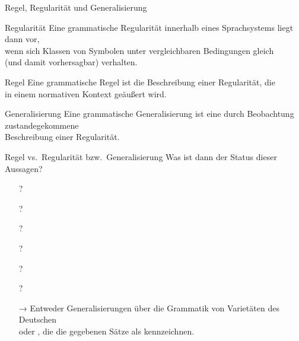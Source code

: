 \begin{frame}
  {Regel, Regularität und Generalisierung}
  \onslide<+->
  \onslide<+->
  \begin{block}{Regularität}
    Eine grammatische Regularität innerhalb eines Sprachsystems liegt dann vor,\\
    wenn sich Klassen von Symbolen unter vergleichbaren Bedingungen gleich\\
    (und damit vorhersagbar) verhalten.
  \end{block}

  \onslide<+->
  \Halbzeile

  \begin{block}{Regel}
    Eine grammatische Regel ist die Beschreibung einer Regularität, die\\
    in einem normativen Kontext geäußert wird.
  \end{block}

  \onslide<+->
  \Halbzeile
  
  \begin{block}{Generalisierung}
    Eine grammatische Generalisierung ist eine durch Beobachtung zustandegekommene\\
    Beschreibung einer Regularität.
  \end{block}
\end{frame}

\begin{frame}
  {Regel vs.\ Regularität bzw.\ Generalisierung}
  \onslide<+->
  \onslide<+->
  Was ist dann der Status dieser Aussagen?\\
  \Zeile 
  \onslide<+->
  \begin{itemize}
    \item[?] 
    \item[?] 
    \item[?] 
    \item[?] 
    \item[?] 
    \item[?] 
  \end{itemize}
  \Zeile
  \begin{itemize}[<+->]
    \item[→] Entweder \alert{Generalisierungen} über die Grammatik von \alert{Varietäten des Deutschen} \\
      oder , die die gegebenen Sätze als  kennzeichnen.
  \end{itemize}
\end{frame}

